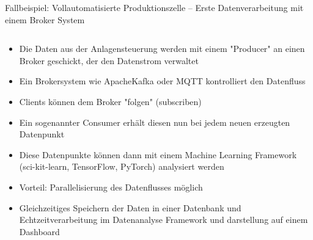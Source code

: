 \documentclass[aspectratio=1610, xcolor=dvipsnames, 9pt]{beamer}
\begin{document}
          \begin{frame}{Fallbeispiel: Vollautomatisierte Produktionszelle -- Erste Datenverarbeitung mit einem Broker System}
                      \begin{columns}
                        \begin{column}{0.6\textwidth}
                          \begin{itemize}
                            \item Die Daten aus der Anlagensteuerung werden mit einem "Producer" an einen Broker geschickt, der den Datenstrom verwaltet \newline
                            \item Ein Brokersystem wie ApacheKafka oder MQTT kontrolliert den Datenfluss \newline
                            \item Clients können dem Broker "folgen" (subscriben) \newline
                            \item Ein sogenannter Consumer erhält diesen nun bei jedem neuen erzeugten Datenpunkt \newline
                            \item Diese Datenpunkte können dann mit einem Machine Learning Framework (sci-kit-learn, TensorFlow, PyTorch) analysiert werden \newline
                            \item Vorteil: Parallelisierung des Datenflusses möglich
                            \item Gleichzeitiges Speichern der Daten in einer Datenbank und Echtzeitverarbeitung im Datenanalyse Framework und darstellung auf einem Dashboard \newline  
                          \end{itemize}
                        \end{column}
                      \end{columns}
           \end{frame}
\end{document}
